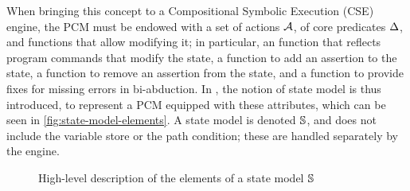 When bringing this concept to a Compositional Symbolic Execution (CSE) engine, the PCM must be endowed with a set of actions ${\cal{A}}$, of core predicates $\Delta$, and functions that allow modifying it; in particular, an \execac{} function that reflects program commands that modify the state, a \produce{} function to add an assertion to the state, a \consume{} function to remove an assertion from the state, and a \fix{} function to provide fixes for missing errors in bi-abduction. In \cite{cse1,cse2,sacha-phd}, the notion of state model is thus introduced, to represent a PCM equipped with these attributes, which can be seen in \autoref{fig:state-model-elements}. A state model is denoted $\mathbb S$, and does not include the variable store or the path condition; these are handled separately by the engine.

\begin{figure}\centering
\setlength{\fboxsep}{0.3cm}
\noindent{}%
\vspace{0.05cm}
\caption{High-level description of the elements of a state model $\mathbb S$}
\label{fig:state-model-elements}
\end{figure}

